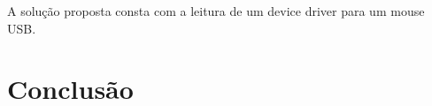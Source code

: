 A solução proposta consta com a leitura de um device driver para um mouse USB.

\section{Conclusão}


